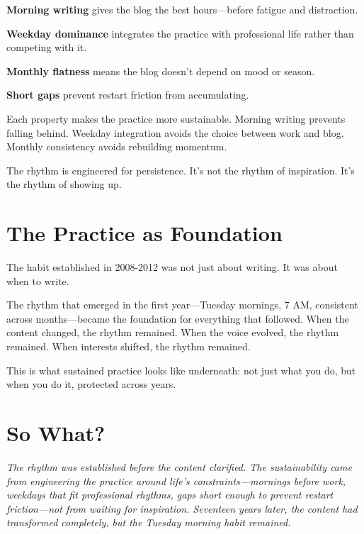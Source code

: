 \textbf{Morning writing} gives the blog the best hours---before fatigue and distraction.

\textbf{Weekday dominance} integrates the practice with professional life rather than competing with it.

\textbf{Monthly flatness} means the blog doesn't depend on mood or season.

\textbf{Short gaps} prevent restart friction from accumulating.

Each property makes the practice more sustainable. Morning writing prevents falling behind. Weekday integration avoids the choice between work and blog. Monthly consistency avoids rebuilding momentum.

The rhythm is engineered for persistence. It's not the rhythm of inspiration. It's the rhythm of showing up.

\bigskip

\section*{The Practice as Foundation}

The habit established in 2008-2012 was not just about writing. It was about when to write.

The rhythm that emerged in the first year---Tuesday mornings, 7 AM, consistent across months---became the foundation for everything that followed. When the content changed, the rhythm remained. When the voice evolved, the rhythm remained. When interests shifted, the rhythm remained.

This is what sustained practice looks like underneath: not just what you do, but when you do it, protected across years.

\bigskip

\section*{So What?}

\textit{The rhythm was established before the content clarified. The sustainability came from engineering the practice around life's constraints—mornings before work, weekdays that fit professional rhythms, gaps short enough to prevent restart friction—not from waiting for inspiration. Seventeen years later, the content had transformed completely, but the Tuesday morning habit remained.}

